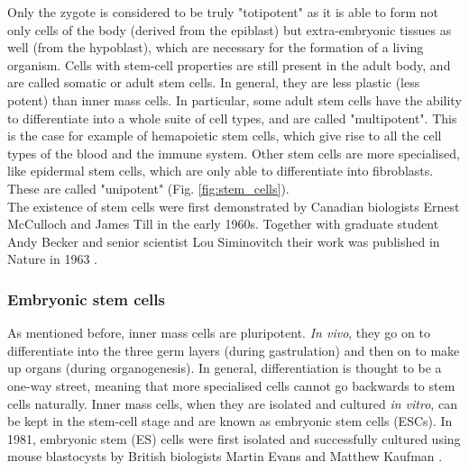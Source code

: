 Only the zygote is considered to be truly "totipotent" as it is able to form not only cells of the body (derived from the epiblast) but extra-embryonic tissues as well (from the hypoblast), which are necessary for the formation of a living organism.
Cells with stem-cell properties are still present in the adult body, and are called somatic or adult stem cells.
In general, they are less plastic (less potent) than inner mass cells.
In particular, some adult stem cells have the ability to differentiate into a whole suite of cell types, and are called "multipotent".
This is the case for example of hemapoietic stem cells, which give rise to all the cell types of the blood and the immune system.
Other stem cells are more specialised, like epidermal stem cells, which are only able to differentiate into fibroblasts.
These are called "unipotent" (Fig. \ref{fig:stem_cells}).\\

The existence of stem cells were first demonstrated by Canadian biologists Ernest McCulloch and James Till in the early 1960s.
Together with graduate student Andy Becker and senior scientist Lou Siminovitch their work was published in Nature in 1963 \cite{becker1963cytological}.


\subsubsection{Embryonic stem cells}

As mentioned before, inner mass cells are pluripotent.
\textit{In vivo}, they go on to differentiate into the three germ layers (during gastrulation) and then on to make up organs (during organogenesis).
In general, differentiation is thought to be a one-way street, meaning that more specialised cells cannot go backwards to stem cells naturally.
Inner mass cells, when they are isolated and cultured \textit{in vitro}, can be kept in the stem-cell stage and are known as embryonic stem cells (ESCs).
In 1981, embryonic stem (ES) cells were first isolated and successfully cultured using mouse blastocysts by British biologists Martin Evans and Matthew Kaufman \cite{evans1981establishment, martin1981isolation}.


